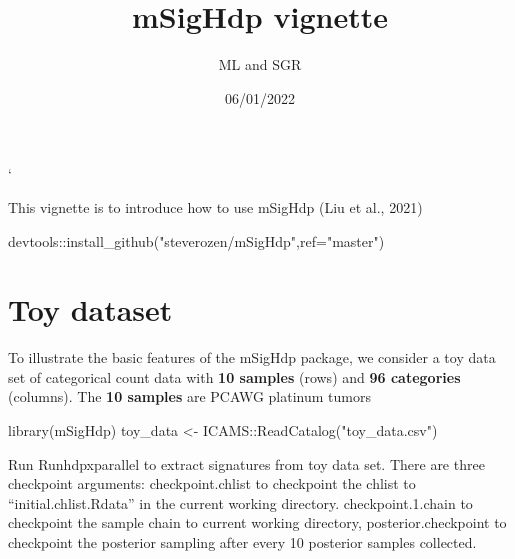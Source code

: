 \documentclass[
]{article}
\title{mSigHdp vignette}
\author{ML and SGR}
\date{06/01/2022}
\newenvironment{Shaded}{\begin{snugshade}}{\end{snugshade}}
\newcommand{\AttributeTok}[1]{\textcolor[rgb]{0.77,0.63,0.00}{#1}}
\newcommand{\FunctionTok}[1]{\textcolor[rgb]{0.00,0.00,0.00}{#1}}
\newcommand{\NormalTok}[1]{#1}
\newcommand{\OtherTok}[1]{\textcolor[rgb]{0.56,0.35,0.01}{#1}}
\newcommand{\SpecialCharTok}[1]{\textcolor[rgb]{0.00,0.00,0.00}{#1}}
\newcommand{\StringTok}[1]{\textcolor[rgb]{0.31,0.60,0.02}{#1}}
\begin{document}
\maketitle

`

This vignette is to introduce how to use mSigHdp (Liu et al., 2021)

\begin{Shaded}
\begin{Highlighting}[]
\NormalTok{devtools}\SpecialCharTok{::}\FunctionTok{install\_github}\NormalTok{(}\StringTok{"steverozen/mSigHdp"}\NormalTok{,}\AttributeTok{ref=}\StringTok{"master"}\NormalTok{)}
\end{Highlighting}
\end{Shaded}

\hypertarget{toy-dataset}{%
\section{Toy dataset}\label{toy-dataset}}

To illustrate the basic features of the mSigHdp package, we consider a
toy data set of categorical count data with \textbf{10 samples} (rows)
and \textbf{96 categories} (columns). The \textbf{10 samples} are PCAWG
platinum tumors

\begin{Shaded}
\begin{Highlighting}[]
\FunctionTok{library}\NormalTok{(mSigHdp)}
\NormalTok{toy\_data }\OtherTok{\textless{}{-}}\NormalTok{ ICAMS}\SpecialCharTok{::}\FunctionTok{ReadCatalog}\NormalTok{(}\StringTok{"toy\_data.csv"}\NormalTok{)}
\end{Highlighting}
\end{Shaded}

Run Runhdpxparallel to extract signatures from toy data set. There are
three checkpoint arguments: checkpoint.chlist to checkpoint the chlist
to ``initial.chlist.Rdata'' in the current working directory.
checkpoint.1.chain to checkpoint the sample chain to current working
directory, posterior.checkpoint to checkpoint the posterior sampling
after every 10 posterior samples collected.
\end{document}
